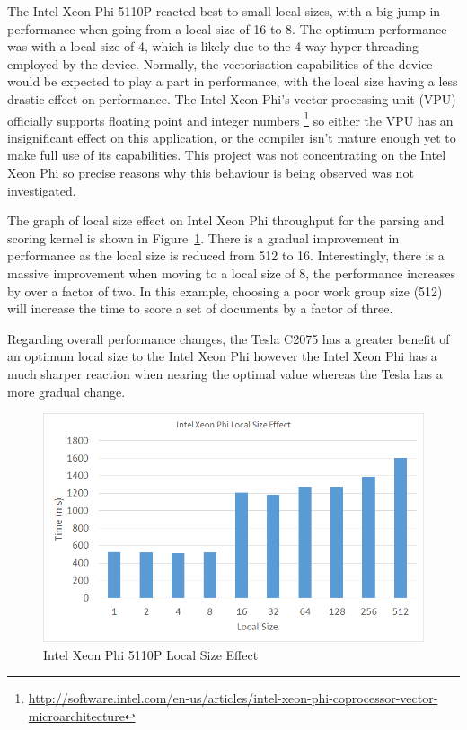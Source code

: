 The Intel Xeon Phi 5110P reacted best to small local sizes, with a big jump in
performance when going from a local size of 16 to 8. The optimum performance was
with a local size of 4, which is likely due to the 4-way hyper-threading
employed by the device. Normally, the vectorisation capabilities of the device
would be expected to play a part in performance, with the local size having a
less drastic effect on performance. The Intel Xeon Phi's vector processing unit
(VPU) officially supports floating point and integer numbers
\footnote{\url{http://software.intel.com/en-us/articles/intel-xeon-phi-coprocessor-vector-microarchitecture}}
so either the VPU has an insignificant effect on this application, or the
compiler isn't mature enough yet to make full use of its capabilities. This
project was not concentrating on the Intel Xeon Phi so precise reasons why this
behaviour is being observed was not investigated.

The graph of local size effect on Intel Xeon Phi throughput for the parsing and
scoring kernel is shown in Figure~\ref{fig:phiLocalSize}. There is a gradual
improvement in performance as the local size is reduced from 512 to 16.
Interestingly, there is a massive improvement when moving to a local size of 8,
the performance increases by over a factor of two. In this example, choosing a
poor work group size (512) will increase the time to score a set of documents by
a factor of three.

Regarding overall performance changes, the Tesla C2075 has a greater benefit of
an optimum local size to the Intel Xeon Phi however the Intel Xeon Phi has a
much sharper reaction when nearing the optimal value whereas the Tesla has a
more gradual change.

\begin{figure}[H]
\includegraphics[width=\linewidth]{images/phiLocalSize.png}
\caption{Intel Xeon Phi 5110P Local Size Effect}
\label{fig:phiLocalSize}
\end{figure}

